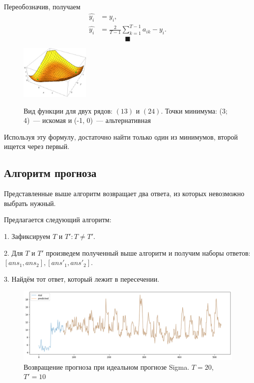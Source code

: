 \documentclass{article}
\begin{document}
Переобозначив, получаем
\begin{align*}
	\hat{y_i} &= y_i,\\
	\hat{y_i} &= \frac{2}{T-1} \sum_{k=1}^{T-1} a_{ik} - y_i.
\end{align*}
$$ \blacksquare $$

\begin{figure}
	\centering
	\begin{center}
		\includegraphics[width=0.3\textwidth]{CorrelationError}
		\label{fig:fig5}
	\end{center}
	\caption{Вид функции для двух рядов: $(1 3)$ и $(2 4)$. Точки минимума: (3; 4)~--- искомая и (-1, 0)~--- альтернативная}
\end{figure}


Используя эту формулу, достаточно найти только один из минимумов, второй ищется через первый.

\subsection{Алгоритм прогноза}

Представленные выше алгоритм возвращает два ответа, из которых невозможно выбрать нужный.

Предлагается следующий алгоритм:

1. Зафиксируем $T$ и $T': T \neq T'$.

2. Для $T$ и $T'$ произведем полученный выше алгоритм и получим наборы ответов: $[ans_1, ans_2], [ans'_1, ans'_2]$.

3. Найдём тот ответ, который лежит в пересечении.


\begin{figure}[H]
	\centering
	\includegraphics[width=\textwidth]{TwoTAlgo.png}
	\caption{Возвращение прогноза при идеальном прогнозе Sigma. $T=20$, $T'=10$}
	\label{fig:fig3}
\end{figure}
\end{document}
